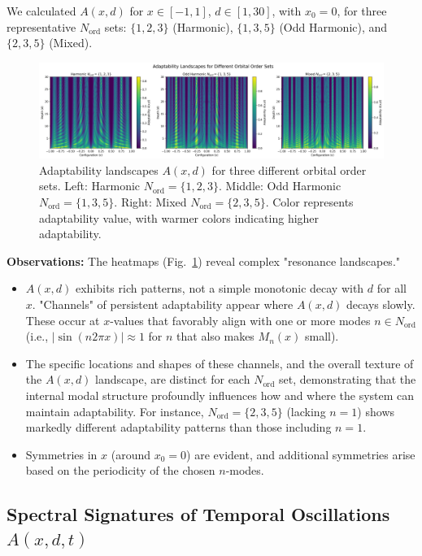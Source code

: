 \documentclass[11pt,a4paper]{article}
\begin{document}
We calculated $A(x,d)$ for $x \in [-1,1]$, $d \in [1,30]$, with $x_0=0$, for three representative $N_{\text{ord}}$ sets: $\{1,2,3\}$ (Harmonic), $\{1,3,5\}$ (Odd Harmonic), and $\{2,3,5\}$ (Mixed).

\begin{figure}[H]
    \centering
    \includegraphics[width=\textwidth]{figures/adaptability_landscapes_combined.png}
    \caption{Adaptability landscapes $A(x,d)$ for three different orbital order sets. Left: Harmonic $N_{\text{ord}}=\{1,2,3\}$. Middle: Odd Harmonic $N_{\text{ord}}=\{1,3,5\}$. Right: Mixed $N_{\text{ord}}=\{2,3,5\}$. Color represents adaptability value, with warmer colors indicating higher adaptability.}
    \label{fig:adaptability_landscapes}
\end{figure}

\textbf{Observations:} The heatmaps (Fig.~\ref{fig:adaptability_landscapes}) reveal complex "resonance landscapes."
\begin{itemize}
    \item $A(x,d)$ exhibits rich patterns, not a simple monotonic decay with $d$ for all $x$. "Channels" of persistent adaptability appear where $A(x,d)$ decays slowly. These occur at $x$-values that favorably align with one or more modes $n \in N_{\text{ord}}$ (i.e., $|\sin(n2\pi x)| \approx 1$ for $n$ that also makes $M_n(x)$ small).
    \item The specific locations and shapes of these channels, and the overall texture of the $A(x,d)$ landscape, are distinct for each $N_{\text{ord}}$ set, demonstrating that the internal modal structure profoundly influences how and where the system can maintain adaptability. For instance, $N_{\text{ord}}=\{2,3,5\}$ (lacking $n=1$) shows markedly different adaptability patterns than those including $n=1$.
    \item Symmetries in $x$ (around $x_0=0$) are evident, and additional symmetries arise based on the periodicity of the chosen $n$-modes.
\end{itemize}

\subsection[Spectral Signatures of Temporal Oscillations]{Spectral Signatures of Temporal Oscillations $A(x,d,t)$}
\end{document}
